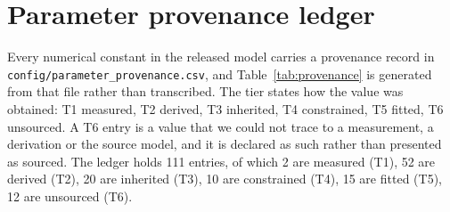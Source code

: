 \appendix

\section{Parameter provenance ledger}
\label{app:params}

Every numerical constant in the released model carries a provenance record in
\texttt{config/parameter\_provenance.csv}, and Table~\ref{tab:provenance} is
generated from that file rather than transcribed. The tier states how the value
was obtained: T1 measured, T2 derived, T3 inherited, T4 constrained, T5 fitted, T6 unsourced. A T6 entry is a value that
we could not trace to a measurement, a derivation or the source model, and it is
declared as such rather than presented as sourced. The ledger holds 111 entries,
of which 2 are measured (T1), 52 are derived (T2), 20 are inherited (T3), 10 are constrained (T4), 15 are fitted (T5), 12 are unsourced (T6).

